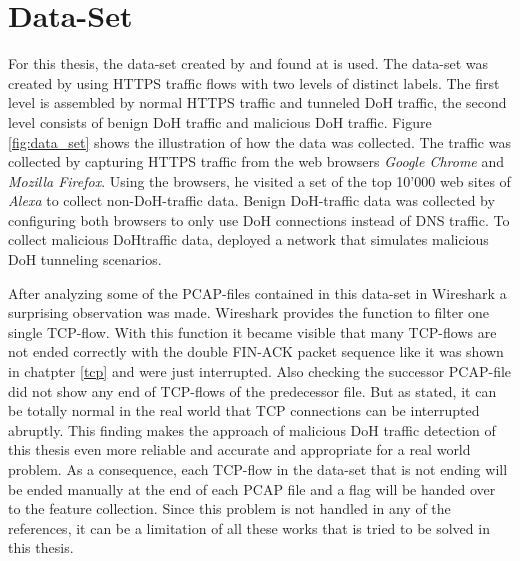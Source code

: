 \section{Data-Set} \label{dataset}
For this thesis, the data-set created by \cite{montazerishatoori2020anomaly} and found at \cite{CIRA-CIC-DoHBrw-2020} is used. The data-set was created by using HTTPS traffic flows with two levels of distinct labels. The first level is assembled by normal HTTPS traffic and tunneled DoH traffic, the second level consists of benign DoH traffic and malicious DoH traffic. Figure \ref{fig:data_set} shows the illustration of how the data was collected. The traffic was collected by capturing HTTPS traffic from the web browsers \textit{Google Chrome} and \textit{Mozilla Firefox}. Using the browsers, he visited a set of the top 10'000 web sites of \textit{Alexa} to collect non-DoH-traffic data. Benign DoH-traffic data was collected by configuring both browsers to only use DoH connections instead of DNS traffic. To collect malicious DoHtraffic data, \cite{montazerishatoori2020anomaly} deployed a network that simulates malicious DoH tunneling scenarios.

After analyzing some of the PCAP-files contained in this data-set in Wireshark a surprising observation was made. Wireshark provides the function to filter one single TCP-flow. With this function it became visible that many TCP-flows are not ended correctly with the double FIN-ACK packet sequence like it was shown in chatpter \ref{tcp} and were just interrupted. Also checking the successor PCAP-file did not show any end of TCP-flows of the predecessor file. But as \cite{Blog_ClosingTCPSession} stated, it can be totally normal in the real world that TCP connections can be interrupted abruptly. This finding makes the approach of malicious DoH traffic detection of this thesis even more reliable and accurate and appropriate for a real world problem. As a consequence, each TCP-flow in the data-set that is not ending will be ended manually at the end of each PCAP file and a flag will be handed over to the feature collection. Since this problem is not handled in any of the references, it can be a limitation of all these works that is tried to be solved in this thesis.

